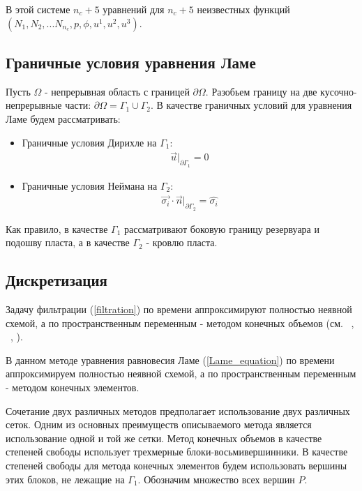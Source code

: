 \documentclass[11pt,twoside]{article}
\begin{document}
В этой системе $n_c + 5$ уравнений для $n_c + 5$ неизвестных функций $(N_1, N_2, ... N_{n_c}, p, \phi, u^1, u^2, u^3)$.

\subsection{Граничные условия уравнения Ламе}
Пусть $\Omega$ - непрерывная область с границей $\partial \Omega$. Разобьем границу на две кусочно-непрерывные части: $\partial \Omega = \Gamma_1 \cup \Gamma_2$. В качестве граничных условий для уравнения Ламе будем рассматривать:
\begin{itemize}
\setlength\itemsep{0 em}
\item {Граничные условия Дирихле на $\Gamma_1$: 
\begin{equation}
\begin{aligned}
\label{Dirichlet}
    \vec{u}|_{\partial \Gamma_1} = 0
\end{aligned}
\end{equation}}
\item {Граничные условия Неймана на $\Gamma_2$:
\begin{equation}
\begin{aligned}
\label{Neuman}
    \vec{\sigma_i} \cdot \vec{n} |_{\partial \Gamma_2} = \hat{\sigma_i}
\end{aligned}
\end{equation}}
\end {itemize}

Как правило, в качестве $\Gamma_1$ рассматривают боковую границу резервуара и подошву пласта, а в качестве $\Gamma_2$ - кровлю пласта.

\subsection{Дискретизация}

Задачу фильтрации (\ref{filtration}) по времени аппроксимируют полностью неявной схемой, а по пространственным переменным - методом конечных объемов (см. ~\cite{Aziz}, ~\cite{Chen}, \cite{BogachevMelnichenko}).

В данном методе уравнения равновесия Ламе (\ref{Lame_equation}) по времени аппроксимируем полностью неявной схемой, а по пространственным переменным - методом конечных элементов.

Сочетание двух различных методов предполагает использование двух различных сеток. Одним из основных преимуществ описываемого метода является использование одной и той же сетки. Метод конечных объемов в качестве степеней свободы использует трехмерные блоки-восьмивершинники. В качестве степеней свободы для метода конечных элементов будем использовать вершины этих блоков, не лежащие на $\Gamma_1$. Обозначим множество всех вершин $P$.
\end{document}
